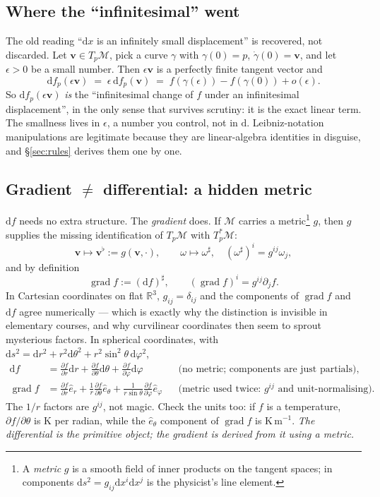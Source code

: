 \documentclass[10pt,a4paper]{article}
\newcommand{\dd}{\mathrm{d}}
\newcommand{\R}{\mathbb{R}}
\newcommand{\M}{\mathcal{M}}
\newcommand{\pd}[2]{\frac{\partial #1}{\partial #2}}
\newcommand{\vv}{\mathbf{v}}
\DeclareMathOperator{\grad}{grad}
\theoremstyle{plain}
\theoremstyle{definition}
\numberwithin{equation}{section}
\begin{document}
\subsection{Where the ``infinitesimal'' went}

The old reading ``$\dd x$ is an infinitely small displacement'' is recovered, not discarded.
Let $\vv\in T_p\M$, pick a curve $\gamma$ with $\gamma(0)=p$, $\dot\gamma(0)=\vv$, and let
$\epsilon>0$ be a small number. Then $\epsilon\vv$ is a perfectly finite tangent vector and
\begin{equation}
\dd f_p(\epsilon\vv)\;=\;\epsilon\,\dd f_p(\vv)\;=\;f(\gamma(\epsilon))-f(\gamma(0))+o(\epsilon).
\end{equation}
So $\dd f_p(\epsilon\vv)$ \emph{is} the ``infinitesimal change of $f$ under an infinitesimal
displacement'', in the only sense that survives scrutiny: it is the exact linear term. The
smallness lives in $\epsilon$, a number you control, not in $\dd$. Leibniz-notation
manipulations are legitimate because they are linear-algebra identities in disguise, and
\S\ref{sec:rules} derives them one by one.

\subsection{Gradient $\ne$ differential: a hidden metric}
\label{sec:metric}

$\dd f$ needs no extra structure. The \emph{gradient} does. If $\M$ carries a
metric\footnote{A \emph{metric} $g$ is a smooth field of inner products on the tangent spaces;
in components $\dd s^2 = g_{ij}\dd x^i\dd x^j$ is the physicist's line element.} $g$, then $g$
supplies the missing identification of $T_p\M$ with $T_p^*\M$:
\begin{equation}
\vv\mapsto\vv^\flat:=g(\vv,\cdot),\qquad \omega\mapsto\omega^\sharp,\quad
(\omega^\sharp)^i=g^{ij}\omega_j ,
\label{eq:musical}
\end{equation}
and by definition
\begin{equation}
\boxed{\ \grad f:=(\dd f)^\sharp,\qquad (\grad f)^i=g^{ij}\partial_jf .\ }
\end{equation}
In Cartesian coordinates on flat $\R^3$, $g_{ij}=\delta_{ij}$ and the components of $\grad f$
and $\dd f$ agree numerically --- which is exactly why the distinction is invisible in
elementary courses, and why curvilinear coordinates then seem to sprout mysterious factors.
In spherical coordinates, with $\dd s^2=\dd r^2+r^2\dd\theta^2+r^2\sin^2\theta\,\dd\varphi^2$,
\begin{align}
\dd f &= \pd{f}{r}\dd r+\pd{f}{\theta}\dd\theta+\pd{f}{\varphi}\dd\varphi
&&\text{(no metric; components are just partials)},\\
\grad f &= \pd{f}{r}\hat e_r+\frac1r\pd{f}{\theta}\hat e_\theta
+\frac{1}{r\sin\theta}\pd{f}{\varphi}\hat e_\varphi
&&\text{(metric used twice: }g^{ij}\text{ and unit-normalising)}.
\end{align}
The $1/r$ factors are $g^{ij}$, not magic. Check the units too: if $f$ is a temperature,
$\partial f/\partial\theta$ is K per radian, while the $\hat e_\theta$ component of $\grad f$
is K\,m$^{-1}$. \emph{The differential is the primitive object; the gradient is derived from it
using a metric.}
\end{document}
